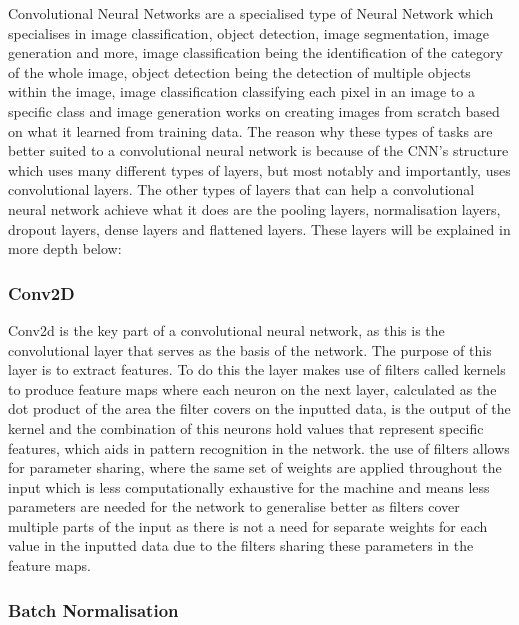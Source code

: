 \documentclass[]{final_report}
\begin{document}
Convolutional Neural Networks are a specialised type of Neural Network which specialises in image classification, object detection, image segmentation, image generation and more, image classification being the identification of the category of the whole image, object detection being the detection of multiple objects within the image, image classification classifying each pixel in an image to a specific class and image generation works on creating images from scratch based on what it learned from training data. The reason why these types of tasks are better suited to a convolutional neural network is because of the CNN’s structure which uses many different types of layers, but most notably and importantly, uses convolutional layers. The other types of layers that can help a convolutional neural network achieve what it does are the pooling layers, normalisation layers, dropout layers, dense layers and flattened layers. These layers will be explained in more depth below: 

\subsubsection{Conv2D}

Conv2d is the key part of a convolutional neural network, as this is the convolutional layer that serves as the basis of the network. The purpose of this layer is to extract features. To do this the layer makes use of filters called kernels to produce feature maps where each neuron on the next layer, calculated as the dot product of the area the filter covers on the inputted data,  is the output of the kernel and the combination of this neurons hold values that represent specific features, which aids in pattern recognition in the network. the use of filters allows for parameter sharing, where the same set of weights are applied throughout the input which is less computationally exhaustive for the machine and means less parameters are needed for the network to generalise better as filters cover multiple parts of the input as there is not a need for separate weights for each value in the inputted data due to the filters sharing these parameters in the feature maps. 

\subsubsection{Batch Normalisation}
\end{document}
